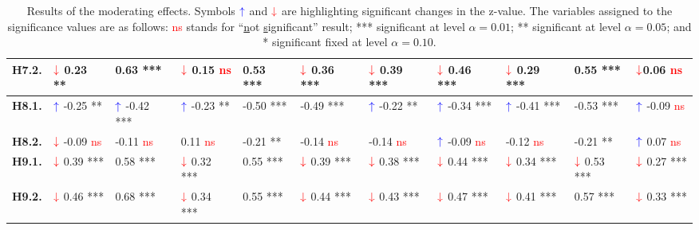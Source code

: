 \begin{table*}
{\begin{tabular}{|l|ll|ll|ll|ll|ll|}
\textbf{H7.2.} &
  \multicolumn{1}{l|}{$\textcolor{red}{\downarrow}$ 0.23 **} &
  0.63 *** &
  \multicolumn{1}{l|}{$\textcolor{red}{\downarrow}$ 0.15 \textcolor{red}{ns}} &
  0.53 *** &
  \multicolumn{1}{l|}{$\textcolor{red}{\downarrow}$ 0.36 ***} &
  $\textcolor{red}{\downarrow}$ 0.39 *** &
  \multicolumn{1}{l|}{$\textcolor{red}{\downarrow}$ 0.46 ***} &
  $\textcolor{red}{\downarrow}$ 0.29 *** &
  \multicolumn{1}{l|}{0.55 ***} &
  $\textcolor{red}{\downarrow}$0.06 \textcolor{red}{ns} \\ \hline
\textbf{H8.1.} &
  \multicolumn{1}{l|}{$\textcolor{blue}{\uparrow}$ -0.25 **} &
  $\textcolor{blue}{\uparrow}$ -0.42 *** &
  \multicolumn{1}{l|}{$\textcolor{blue}{\uparrow}$ -0.23 **} &
  -0.50 *** &
  \multicolumn{1}{l|}{-0.49 ***} &
  $\textcolor{blue}{\uparrow}$ -0.22 ** &
  \multicolumn{1}{l|}{$\textcolor{blue}{\uparrow}$ -0.34 ***} &
  $\textcolor{blue}{\uparrow}$ -0.41 *** &
  \multicolumn{1}{l|}{-0.53 ***} &
  $\textcolor{blue}{\uparrow}$ -0.09 \textcolor{red}{ns} \\ \hline
\textbf{H8.2.} &
  \multicolumn{1}{l|}{$\textcolor{red}{\downarrow}$ -0.09 \textcolor{red}{ns}} &
  -0.11 \textcolor{red}{ns} &
  \multicolumn{1}{l|}{0.11 \textcolor{red}{ns}} &
  -0.21 ** &
  \multicolumn{1}{l|}{-0.14 \textcolor{red}{ns}} &
  -0.14 \textcolor{red}{ns} &
  \multicolumn{1}{l|}{$\textcolor{blue}{\uparrow}$ -0.09 \textcolor{red}{ns}} &
  -0.12 \textcolor{red}{ns} &
  \multicolumn{1}{l|}{-0.21 **} &
  $\textcolor{blue}{\uparrow}$ 0.07 \textcolor{red}{ns} \\ \hline
\textbf{H9.1.} &
  \multicolumn{1}{l|}{$\textcolor{red}{\downarrow}$ 0.39 ***} &
  0.58 *** &
  \multicolumn{1}{l|}{$\textcolor{red}{\downarrow}$ 0.32 ***} &
  0.55 *** &
  \multicolumn{1}{l|}{$\textcolor{red}{\downarrow}$ 0.39 ***} &
  $\textcolor{red}{\downarrow}$ 0.38 *** &
  \multicolumn{1}{l|}{$\textcolor{red}{\downarrow}$ 0.44 ***} &
  $\textcolor{red}{\downarrow}$ 0.34 *** &
  \multicolumn{1}{l|}{$\textcolor{red}{\downarrow}$ 0.53 ***} &
  $\textcolor{red}{\downarrow}$ 0.27 *** \\ \hline
\textbf{H9.2.} &
  \multicolumn{1}{l|}{$\textcolor{red}{\downarrow}$ 0.46 ***} &
  0.68 *** &
  \multicolumn{1}{l|}{$\textcolor{red}{\downarrow}$ 0.34 ***} &
  0.55 *** &
  \multicolumn{1}{l|}{$\textcolor{red}{\downarrow}$ 0.44 ***} &
  $\textcolor{red}{\downarrow}$ 0.43 *** &
  \multicolumn{1}{l|}{$\textcolor{red}{\downarrow}$ 0.47 ***} &
  $\textcolor{red}{\downarrow}$ 0.41 *** &
  \multicolumn{1}{l|}{0.57 ***} &
  $\textcolor{red}{\downarrow}$ 0.33 *** \\ \hline
\end{tabular}%
}
\caption{Results of the moderating effects. Symbols $\textcolor{blue}{\uparrow}$ and $\textcolor{red}{\downarrow}$ are highlighting significant changes in
the z-value. The variables assigned to the significance values are as follows: \textcolor{red}{ns} stands for ``\underline{n}ot \underline{s}ignificant'' result; *** significant at level $\alpha = 0.01$; ** significant at level $\alpha = 0.05$; and * significant fixed at level $\alpha = 0.10$.}
\label{tab:tab012}
\end{table*}